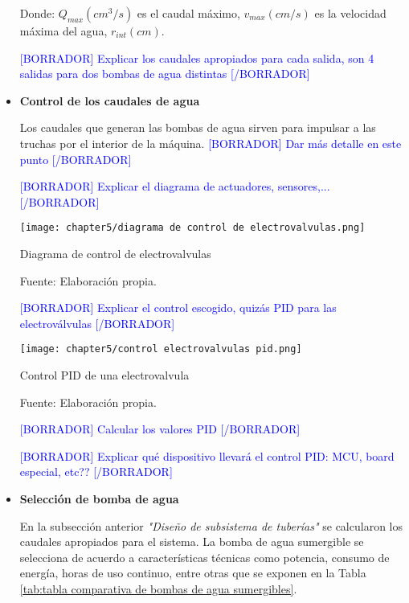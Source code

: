 \begin{itemize}
	Donde: $Q_{max} (cm^3/s)$ es el caudal máximo, $v_{max} (cm/s)$ es la velocidad máxima del agua, $r_{int} (cm)$.
	
	\textcolor{blue}{[BORRADOR] Explicar los caudales apropiados para cada salida, son 4 salidas para dos bombas de agua distintas [/BORRADOR]} 	
	
	\item \textbf{Control de los caudales de agua}
	
	Los caudales que generan las bombas de agua sirven para impulsar a las truchas por el interior de la máquina. \textcolor{blue}{[BORRADOR] Dar más detalle en este punto [/BORRADOR]}
	
	\textcolor{blue}{[BORRADOR] Explicar el diagrama de actuadores, sensores,... [/BORRADOR]}
	
	\begin{myfigure}[H]
		\centering
		\texttt{[image: chapter5/diagrama de control de electrovalvulas.png]}
		\caption{Diagrama de control de electrovalvulas}
		\begin{myflushleftportland}
			Fuente: Elaboración propia.
		\end{myflushleftportland}
		\label{fig:diagrama de control de electrovalvulas}
	\end{myfigure}
	
	\textcolor{blue}{[BORRADOR] Explicar el control escogido, quizás PID para las electroválvulas [/BORRADOR]}
	
	\begin{myfigure}[H]
		\centering
		\texttt{[image: chapter5/control electrovalvulas pid.png]}
		\caption{Control PID de una electrovalvula}
		\begin{myflushleftportland}
			Fuente: Elaboración propia.
		\end{myflushleftportland}
		\label{fig:control electrovalvulas pid}
	\end{myfigure}
	
	\textcolor{blue}{[BORRADOR] Calcular los valores PID [/BORRADOR]}
	
	\textcolor{blue}{[BORRADOR] Explicar qué dispositivo llevará el control PID: MCU, board especial, etc?? [/BORRADOR]}
	
	\item \textbf{Selección de bomba de agua}
	
	En la subsección anterior \textit{"Diseño de subsistema de tuberías"} se calcularon los caudales apropiados para el sistema. La bomba de agua sumergible se selecciona de acuerdo a características técnicas como potencia, consumo de energía, horas de uso continuo, entre otras que se exponen en la Tabla \ref{tab:tabla comparativa de bombas de agua sumergibles}.	
	

\end{itemize}
